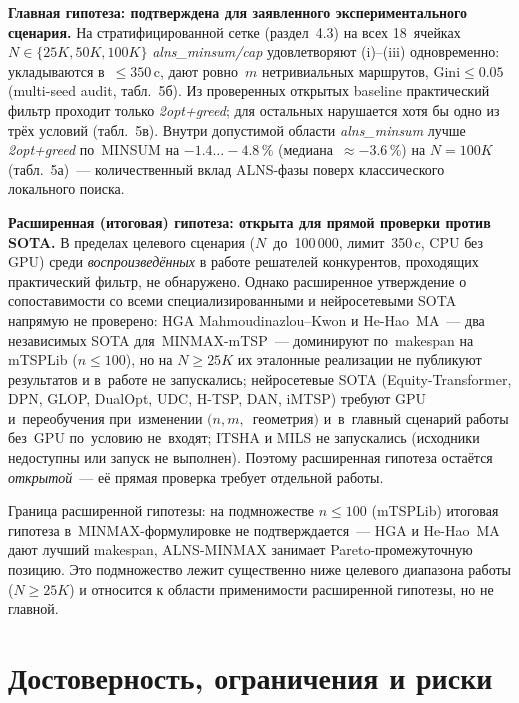\documentclass[a4paper,14pt]{extreport}
\begin{document}
\medskip
\textbf{Главная гипотеза: подтверждена для заявленного экспериментального сценария.} На стратифицированной сетке (раздел~4.3) на всех 18~ячейках $N\in\{25K,50K,100K\}$ \emph{alns\_minsum/cap} удовлетворяют (i)--(iii) одновременно: укладываются в~$\leq 350$\,c, дают ровно~$m$ нетривиальных маршрутов, $\mathrm{Gini}\leq 0.05$ (multi-seed audit, табл.~5б). Из проверенных открытых baseline практический фильтр проходит только \emph{2opt+greed}; для остальных нарушается хотя бы одно из трёх условий (табл.~5в). Внутри допустимой области \emph{alns\_minsum} лучше \emph{2opt+greed} по~MINSUM на $-1.4\dots-4.8\,\%$ (медиана~$\approx -3.6\,\%$) на $N=100K$ (табл.~5а)~--- количественный вклад ALNS-фазы поверх классического локального поиска.

\medskip
\textbf{Расширенная (итоговая) гипотеза: открыта для прямой проверки против SOTA.} В пределах целевого сценария ($N$~до~100\,000, лимит~350\,c, CPU без GPU) среди \emph{воспроизведённых} в работе решателей конкурентов, проходящих практический фильтр, не обнаружено. Однако расширенное утверждение о сопоставимости со всеми специализированными и нейросетевыми SOTA напрямую не проверено: HGA Mahmoudinazlou--Kwon и He-Hao~MA~--- два независимых SOTA для~MINMAX-mTSP~--- доминируют по~makespan на mTSPLib ($n\leq 100$), но на $N\geq 25K$ их эталонные реализации не публикуют результатов и в~работе не запускались; нейросетевые SOTA (Equity-Transformer, DPN, GLOP, DualOpt, UDC, H-TSP, DAN, iMTSP) требуют GPU и~переобучения при~изменении $(n,m,$~геометрия$)$ и~в~главный сценарий работы без~GPU по~условию не~входят; ITSHA и MILS не запускались (исходники недоступны или запуск не выполнен). Поэтому расширенная гипотеза остаётся \emph{открытой}~--- её прямая проверка требует отдельной работы.

Граница расширенной гипотезы: на подмножестве $n\leq 100$ (mTSPLib) итоговая гипотеза в~MINMAX-формулировке не подтверждается~--- HGA и He-Hao~MA дают лучший makespan, ALNS-MINMAX занимает Pareto-промежуточную позицию. Это подмножество лежит существенно ниже целевого диапазона работы ($N\geq 25K$) и относится к области применимости расширенной гипотезы, но не главной.

\chapter{Достоверность, ограничения и риски}
\end{document}
